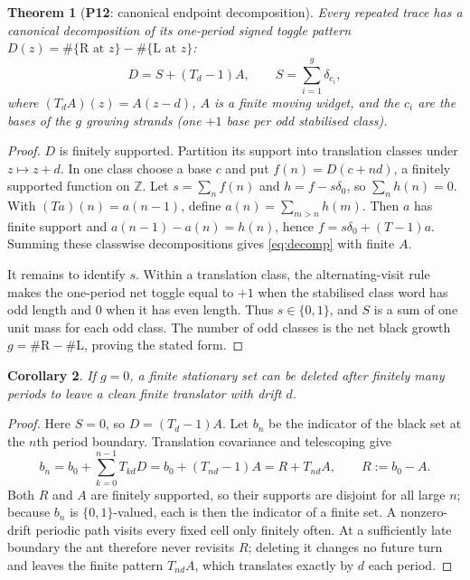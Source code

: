 \documentclass[11pt,reqno]{amsart}
\theoremstyle{plain}
\newtheorem{theorem}{Theorem}[section]
\newtheorem{corollary}[theorem]{Corollary}
\theoremstyle{definition}
\newcommand{\Z}{\mathbb{Z}}
\newcommand{\drift}{d}
\newcommand{\growth}{g}
\newcommand{\turnR}{\mathrm{R}}
\newcommand{\turnL}{\mathrm{L}}
\newcommand{\PN}[1]{\textbf{P#1}}
\begin{document}
\begin{theorem}[\PN{12}: canonical endpoint decomposition]\label{thm:decomp}
Every repeated trace has a canonical decomposition of its one-period signed
toggle pattern
$D(z)=\#\{\turnR\text{ at }z\}-\#\{\turnL\text{ at }z\}$:
\begin{equation}\label{eq:decomp}
D=S+(T_\drift-1)A,\qquad S=\sum_{i=1}^{\growth}\delta_{c_i},
\end{equation}
where $(T_\drift A)(z)=A(z-\drift)$, $A$ is a finite moving widget, and the
$c_i$ are the bases of the $\growth$ growing strands (one $+1$ base per odd
stabilised class).
\end{theorem}

\begin{proof}
$D$ is finitely supported. Partition its support into translation classes under
$z\mapsto z+\drift$. In one class choose a base $c$ and put
$f(n)=D(c+n\drift)$, a finitely supported function on $\Z$. Let
$s=\sum_n f(n)$ and $h=f-s\delta_0$, so $\sum_nh(n)=0$. With
$(Ta)(n)=a(n-1)$, define $a(n)=\sum_{m>n}h(m)$. Then $a$ has finite support and
$a(n-1)-a(n)=h(n)$, hence $f=s\delta_0+(T-1)a$. Summing these classwise
decompositions gives \eqref{eq:decomp} with finite $A$.

It remains to identify $s$. Within a translation class, the alternating-visit
rule makes the one-period net toggle equal to $+1$ when the stabilised class word
has odd length and $0$ when it has even length. Thus $s\in\{0,1\}$, and $S$ is a
sum of one unit mass for each odd class. The number of odd classes is the net
black growth $\growth=\#\turnR-\#\turnL$, proving the stated form.
\end{proof}

\begin{corollary}\label{cor:sep}
If $\growth=0$, a finite stationary set can be deleted after finitely many periods
to leave a clean finite translator with drift $\drift$.
\end{corollary}

\begin{proof}
Here $S=0$, so $D=(T_\drift-1)A$. Let $b_n$ be the indicator of the black set at
the $n$th period boundary. Translation covariance and telescoping give
\[
b_n=b_0+\sum_{k=0}^{n-1}T_{k\drift}D
   =b_0+(T_{n\drift}-1)A=R+T_{n\drift}A,\qquad R:=b_0-A.
\]
Both $R$ and $A$ are finitely supported, so their supports are disjoint for all
large $n$; because $b_n$ is $\{0,1\}$-valued, each is then the indicator of a
finite set. A nonzero-drift periodic path visits every fixed cell only finitely
often. At a sufficiently late boundary the ant therefore never revisits $R$;
deleting it changes no future turn and leaves the finite pattern $T_{n\drift}A$,
which translates exactly by $\drift$ each period.
\end{proof}
\end{document}
